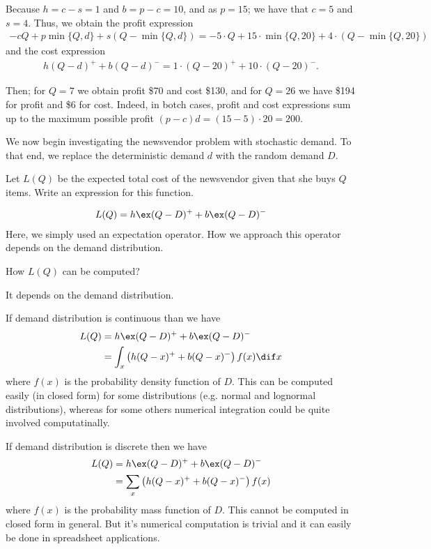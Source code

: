 \begin{solution}
Because $h=c-s=1$ and $b=p-c=10$, and as $p=15$; we have that $c=5$ and $s=4$. Thus, we obtain the profit expression
\begin{align*}
-cQ + p\min\{Q,d\} + s(Q-\min\{Q,d\}) = -5\cdot Q + 15\cdot\min\{Q,20\} + 4\cdot(Q-\min\{Q,20\})
\end{align*}
and the cost expression
\begin{align*}
h(Q-d)^+ + b(Q-d)^- = 1\cdot (Q-20)^+ + 10\cdot(Q-20)^-.
\end{align*}

Then; for $Q=7$ we obtain profit \$70 and cost \$130, and for $Q=26$ we have \$194 for profit and \$6 for cost. Indeed, in botch cases, profit and cost expressions sum up to the maximum possible profit $(p-c)d=(15-5)\cdot 20=200$.
\end{solution}

We now begin investigating the newsvendor problem with stochastic demand. To that end, we replace the deterministic demand $d$ with the random demand $D$. 

\begin{question}
Let $L(Q)$ be the expected total cost of the newsvendor given that she buys $Q$ items. Write an expression for this function.
\end{question}

\begin{solution}
\begin{align*}
L(Q) = h\ex (Q-D)^+ + b\ex (Q-D)^-
\end{align*}
Here, we simply used an expectation operator. How we approach this operator depends on the demand distribution. 
\end{solution}

\begin{question}
How $L(Q)$ can be computed?
\end{question}

\begin{solution}
It depends on the demand distribution. 

If demand distribution is continuous than we have 
\begin{align*}
L(Q) & = h \ex (Q-D)^+ + b \ex (Q-D)^- \\
	 & = \int_x \left(h (Q-x)^+ + b (Q-x)^-\right) f(x) \dif x
\end{align*}
where $f(x)$ is the probability density function of $D$. This can be computed easily (in closed form) for some distributions (e.g. normal and lognormal distributions), whereas for some others numerical integration could be quite involved computatinally.

If demand distribution is discrete then we have 
\begin{align*}
L(Q) & = h \ex (Q-D)^+ + b \ex (Q-D)^- \\
	 & = \sum_x \left(h (Q-x)^+ + b (Q-x)^-\right) f(x)
\end{align*}
where $f(x)$ is the probability mass function of $D$. This cannot be computed in closed form in general. But it's numerical computation is trivial and it can easily be done in spreadsheet applications.
\end{solution}


